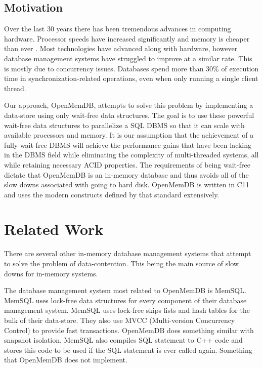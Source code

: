 \documentclass[conference, compsoc]{IEEEtran}
\newcommand{\CC}{C\nolinebreak\hspace{-.05em}\raisebox{.4ex}{\tiny\bf +}\nolinebreak\hspace{-.10em}\raisebox{.4ex}{\tiny\bf +}}
\begin{document}
\subsection{Motivation}
Over the last 30 years there has been tremendous advances in computing
hardware. Processor speeds have increased significantly and memory is cheaper than ever
\cite{stonebraker2007end}. Most technologies have advanced 
along with hardware, however database management systems have struggled to improve
at a similar rate. This is mostly due to concurrency issues. Databases spend more than 30\% 
of execution time in synchronization-related operations, even when only running a single
client thread\cite{soares2015database}.
\par\vspace{\baselineskip}
Our approach, OpenMemDB, attempts to solve this problem by implementing a data-store 
using only wait-free data structures. The goal is to use these powerful wait-free data 
structures to parallelize a SQL DBMS so that it can scale with available processors
and memory. It is our assumption that the achievement of a fully wait-free DBMS will 
achieve the performance gains that have been lacking in the DBMS field while eliminating 
the complexity of multi-threaded systems, all while retaining necessary ACID properties. 
The requirements of being wait-free dictate that OpenMemDB is an in-memory database and 
thus avoids all of the slow downs associated with going to hard disk. OpenMemDB is written 
in \CC 11 and uses the modern constructs defined by that standard extensively.
\par\vspace{\baselineskip}

\section{Related Work}
There are several other in-memory database management systems that attempt to solve the 
problem of data-contention. This being the main source of slow downs for in-memory systems.

The database management system most related to OpenMemDB is MemSQL.
MemSQL uses lock-free data structures for every component of their database management
system. MemSQL uses lock-free skips lists and hash tables for the bulk of their data-store\cite{MemSQL}.
They also use MVCC (Multi-version Concurrency Control) to provide fast transactions. 
OpenMemDB does something similar with snapshot isolation. MemSQL also compiles SQL
statement to C++ code and stores this code to be used if the SQL statement is ever called
again. Something that OpenMemDB does not implement.
\end{document}
